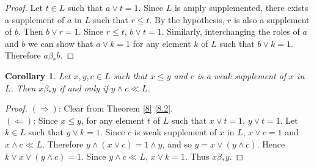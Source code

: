 \documentclass[a4paper,12pt]{article}
\newtheorem{corollary}[theorem]{Corollary}
\numberwithin{equation}{section}
\begin{document}
\begin{proof}
  Let $ t \in L $ such that $ a \vee t = 1 $. Since $ L $ is amply supplemented, there exists 
  a supplement of $ a $ in $ L $ such that $ r \leq t $. By the hypothesis, 
  $ r $ is also a supplement of $ b $. Then $ b \vee r = 1 $. Since $ r \leq t $, $ b \vee t = 1 $. 
  Similarly, interchanging the roles of $ a $ and $ b $ we can show that $ a \vee k = 1 $ for any 
  element $ k $ of $ L $ such that $ b \vee k = 1 $. Therefore $ a \beta_* b $.
\end{proof}

\begin{corollary}\label{10}
  Let $ x,y,c \in L $ such that $ x \leq y $ and $ c $ is a weak supplement of $ x $ in $ L $. Then 
  $ x \beta_* y $ if and only if $ y \wedge c \ll L $.
\end{corollary}

\begin{proof}
  $ ( \Rightarrow ) $: 
  Clear from Theorem \ref{8} \ref{8.2}. \\
  $ ( \Leftarrow ) $:  
  Since $ x \leq y $, for any element $ t $ of $ L $ such that $ x \vee t = 1 $, $ y \vee t = 1 $. 
  Let $ k \in L $ such that $ y \vee k = 1 $. Since $ c $ is weak supplement of $ x $ in $ L $, 
  $ x \vee c = 1 $ and $ x \wedge c \ll L $. Therefore $ y \wedge ( x \vee c ) = 1 \wedge y $, and so 
  $ y = x \vee ( y \wedge c ) $. Hence $ k \vee x \vee ( y \wedge c ) = 1 $. Since $ y \wedge c \ll L $, 
  $ x \vee k = 1 $. Thus $ x \beta_* y $.
\end{proof}

\end{document}
